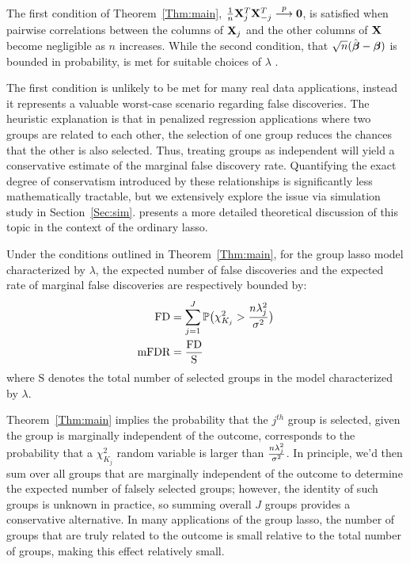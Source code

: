 The first condition of Theorem~\ref{Thm:main}, $\tfrac{1}{n}\mathbf{X}_j^T \mathbf{X}_{-j}^T \overset{p}{\longrightarrow} \mathbf{0}$, is satisfied when pairwise correlations between the columns of $\mathbf{X}_j$ and the other columns of $\mathbf{X}$ become negligible as $n$ increases. While the second condition, that $\sqrt{n}(\hat{\boldsymbol{\beta}} - \boldsymbol{\beta})$ is bounded in probability, is met for suitable choices of $\lambda$ \citep{Liu2009}.

The first condition is unlikely to be met for many real data applications, instead it represents a valuable worst-case scenario regarding false discoveries. The heuristic explanation is that in penalized regression applications where two groups are related to each other, the selection of one group reduces the chances that the other is also selected. Thus, treating groups as independent will yield a conservative estimate of the marginal false discovery rate. Quantifying the exact degree of conservatism introduced by these relationships is significantly less mathematically tractable, but we extensively explore the issue via simulation study in Section~\ref{Sec:sim}. \citet{Breheny2019} presents a more detailed theoretical discussion of this topic in the context of the ordinary lasso.

\begin{clry}
\label{Clry:main}
Under the conditions outlined in Theorem~\ref{Thm:main}, for the group lasso model characterized by $\lambda$, the expected number of false discoveries and the expected rate of marginal false discoveries are respectively bounded by:
\begin{align}
\label{eq:Mfdr}
\begin{alignedat}{2}
\textrm{FD} &= \sum_{j = 1}^{J} \mathbb{P} \big(\chi^2_{K_j} > \frac{n\lambda_j^2}{\sigma^2}\big)\\
\textrm{mFDR} &= \frac{\textrm{FD}}{\text{S}} 
\end{alignedat}
\end{align}
where $\text{S}$ denotes the total number of selected groups in the model characterized by $\lambda$.
\end{clry}

Theorem~\ref{Thm:main} implies the probability that the $j^{th}$ group is selected, given the group is marginally independent of the outcome, corresponds to the probability that a $\chi^2_{K_j}$ random variable is larger than $\frac{n\lambda_j^2}{\sigma^2}$. In principle, we'd then sum over all groups that are marginally independent of the outcome to determine the expected number of falsely selected groups; however, the identity of such groups is unknown in practice, so summing overall $J$ groups provides a conservative alternative. In many applications of the group lasso, the number of groups that are truly related to the outcome is small relative to the total number of groups, making this effect relatively small.

